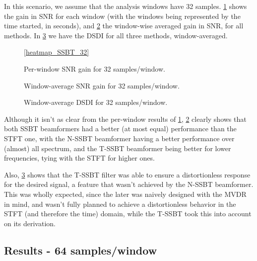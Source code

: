 In this scenario, we assume that the analysis windows have 32 samples. \cref{fig:heatmap_gain_32} shows the gain in SNR for each window (with the windows being represented by the time started, in seconds), and \cref{fig:lineplot_gain_32} the window-wise averaged gain in SNR, for all methods. In \cref{fig:lineplot_dsdi_32} we have the DSDI for all three methods, window-averaged.



\begin{figure}[H]
	\centering
	
	
	\vspace*{0.4em}
	\ref*{heatmap_SSBT_32}
	\caption{Per-window SNR gain for 32 samples/window.}
	\label{fig:heatmap_gain_32}
\end{figure}

\begin{figure}[H]
\centering

\caption{Window-average SNR gain for 32 samples/window.}
\label{fig:lineplot_gain_32}
\end{figure}

\begin{figure}[H]
	\centering
	
	\caption{Window-average DSDI for 32 samples/window.}
	\label{fig:lineplot_dsdi_32}
\end{figure}

Although it isn't as clear from the per-window results of \cref{fig:heatmap_gain_32}, \cref{fig:lineplot_gain_32} clearly shows that both SSBT beamformers had a better (at most equal) performance than the STFT one, with the N-SSBT beamformer having a better performance over (almost) all spectrum, and the T-SSBT beamformer being better for lower frequencies, tying with the STFT for higher ones.

Also, \cref{fig:lineplot_dsdi_32} shows that the T-SSBT filter was able to ensure a distortionless response for the desired signal, a feature that wasn't achieved by the N-SSBT beamformer. This was wholly expected, since the later was naively designed with the MVDR in mind, and wasn't fully planned to achieve a distortionless behavior in the STFT (and therefore the time) domain, while the T-SSBT took this into account on its derivation.
%
\subsection{Results - 64 samples/window}

